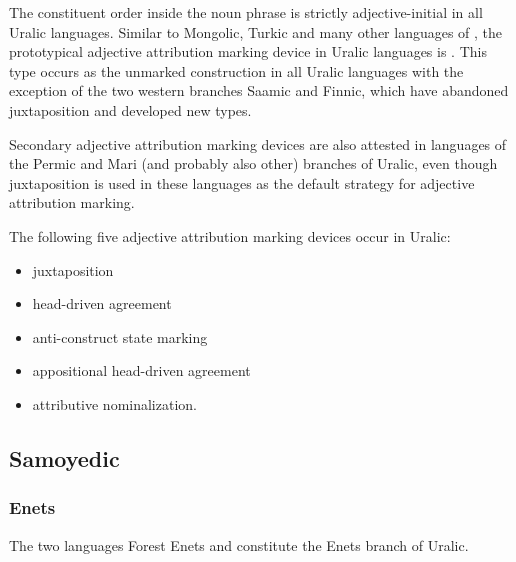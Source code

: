The constituent order inside the noun phrase is strictly adjective-initial in all Uralic languages. Similar to Mongolic, Turkic and many other languages of , the prototypical adjective attribution marking device in Uralic languages is . This type occurs as the unmarked construction in all Uralic languages with the exception of the two western branches Saamic and Finnic, which have abandoned juxtaposition and developed new types.

Secondary adjective attribution marking devices are also attested in languages of the Permic and Mari (and probably also other) branches of Uralic, even though juxtaposition is used in these languages as the default strategy for adjective attribution marking.

The following five adjective attribution marking devices occur in Uralic:
\begin{itemize}
\item juxtaposition
\item head\hyp{}driven agreement
\item anti\hyp{}construct state marking
\item appositional head\hyp{}driven agreement
\item attributive nominalization.
\end{itemize}

\subsection{Samoyedic}
\subsubsection{Enets}
The two languages Forest Enets and  constitute the Enets branch of Uralic.

